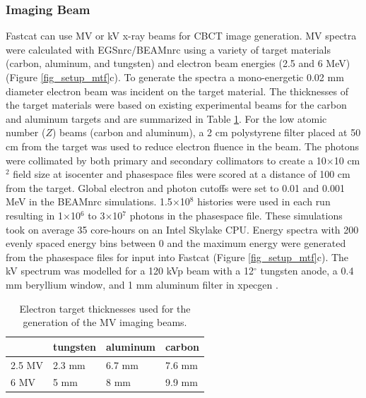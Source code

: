 \subsubsection{Imaging Beam}

Fastcat can use MV or kV x-ray beams for CBCT image generation. MV spectra were calculated with EGSnrc/BEAMnrc \cite{IKawrakow2018TheTransport} using a variety of target materials (carbon, aluminum, and tungsten) and electron beam energies (2.5 and 6 MeV) (Figure \ref{fig_setup_mtf}c). To generate the spectra a mono-energetic 0.02 mm diameter electron beam was incident on the target material. The thicknesses of the target materials were based on existing experimental beams for the carbon and aluminum targets \cite{Flampouri2002OptimizationExperiment} and are summarized in Table \ref{tab:targets_cwo}. For the low atomic number ($Z$) beams (carbon and aluminum), a 2 cm polystyrene filter placed at 50 cm from the target was used to reduce electron fluence in the beam. The photons were collimated by both primary and secondary collimators to create a 10$\times$10 cm$^2$ field size at isocenter and phasespace files were scored at a distance of 100 cm from the target. Global electron and photon cutoffs were set to 0.01 and 0.001 MeV in the BEAMnrc simulations. 1.5$\times$10$^8$ histories were used in each run resulting in 1$\times$10$^6$ to 3$\times$10$^7$ photons in the phasespace file. These simulations took on average 35 core-hours on an Intel Skylake CPU.  Energy spectra with 200 evenly spaced energy bins between 0 and the maximum energy were generated from the phasespace files for input into Fastcat (Figure \ref{fig_setup_mtf}c). The kV spectrum was modelled for a 120 kVp beam with a 12$^\circ$ tungsten anode, a 0.4 mm beryllium window, and 1 mm aluminum filter in xpecgen \cite{Hernandez2016Xpecgen:Anodes}.

\begin{table}[ht]
\begin{center}
\caption{Electron target thicknesses used for the generation of the MV imaging beams.}
\vspace*{1ex}
\label{tab:targets_cwo}
\begin{tabular}{llll}
 \hline
       & tungsten & aluminum & carbon \\  \hline
2.5 MV & 2.3 mm   & 6.7 mm \cite{Parsons2014AVirtuaLinac} & 7.6 mm \cite{Parsons2012BeamTargets}\\
6 MV   & 5 mm     & 8 mm \cite{Baek2019AssessmentFilter}     & 9.9 mm \cite{Parsons2012BeamTargets}
\end{tabular}
\end{center}
\end{table}

